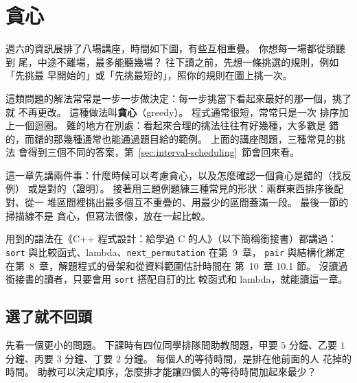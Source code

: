\chapter{貪心}
\label{ch:greedy}

週六的資訊展排了八場講座，時間如下圖，有些互相重疊。 你想每一場都從頭聽到
尾，中途不離場，最多能聽幾場？ 往下讀之前，先想一條挑選的規則，例如「先挑最
早開始的」或「先挑最短的」，照你的規則在圖上挑一次。

\begin{center}
\label{fig:talks}
\end{center}

這類問題的解法常常是一步一步做決定：每一步挑當下看起來最好的那一個，挑了就
不再更改。 這種做法叫\textbf{貪心}（greedy）。 程式通常很短，常常只是一次
排序加上一個迴圈。 難的地方在別處：看起來合理的挑法往往有好幾種，大多數是
錯的，而錯的那幾種通常也能通過題目給的範例。 上面的講座問題，三種常見的挑法
會得到三個不同的答案，第~\ref{sec:interval-scheduling}~節會回來看。

這一章先講兩件事：什麼時候可以考慮貪心，以及怎麼確認一個貪心是錯的（找反例）
或是對的（證明）。 接著用三題例題練三種常見的形狀：兩群東西排序後配對、從一
堆區間裡挑出最多個互不重疊的、用最少的區間蓋滿一段。 最後一節的掃描線不是
貪心，但寫法很像，放在一起比較。

用到的語法在《C++ 程式設計：給學過 C 的人》（以下簡稱銜接書）都講過：
\texttt{sort} 與比較函式、lambda、\texttt{next\_permutation} 在第~9~章，
\texttt{pair} 與結構化綁定在第~8~章，解題程式的骨架和從資料範圍估計時間在
第~10~章 10.1 節。 沒讀過銜接書的讀者，只要會用 \texttt{sort} 搭配自訂的比
較函式和 lambda，就能讀這一章。

\section{選了就不回頭}
\label{sec:greedy-idea}

先看一個更小的問題。 下課時有四位同學排隊問助教問題，甲要 $5$ 分鐘、乙要
$1$ 分鐘、丙要 $3$ 分鐘、丁要 $2$ 分鐘。 每個人的等待時間，是排在他前面的人
花掉的時間。 助教可以決定順序，怎麼排才能讓四個人的等待時間加起來最少？

